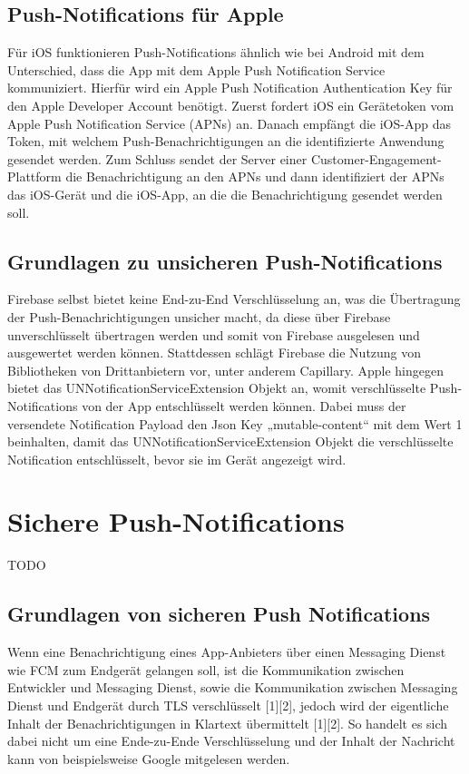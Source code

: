 \documentclass[sigconf]{acmart}
\begin{document}
\subsection{Push-Notifications für Apple}

Für iOS funktionieren Push-Notifications ähnlich wie bei Android 
mit dem Unterschied, dass die App mit dem Apple Push Notification 
Service kommuniziert. Hierfür wird ein Apple Push Notification 
Authentication Key für den Apple Developer Account benötigt. 
Zuerst fordert iOS ein Gerätetoken vom Apple Push Notification 
Service (APNs) an. Danach empfängt die iOS-App das Token, mit 
welchem Push-Benachrichtigungen an die identifizierte Anwendung 
gesendet werden. Zum Schluss sendet der Server einer 
Customer-Engagement-Plattform die Benachrichtigung an den APNs 
und dann identifiziert der APNs das iOS-Gerät und die iOS-App, 
an die die Benachrichtigung gesendet werden soll.

\subsection{Grundlagen zu unsicheren Push-Notifications}

Firebase selbst bietet keine End-zu-End Verschlüsselung an, was 
die Übertragung der Push-Benachrichtigungen unsicher macht, da 
diese über Firebase unverschlüsselt übertragen werden und somit 
von Firebase ausgelesen und ausgewertet werden können. Stattdessen 
schlägt Firebase die Nutzung von Bibliotheken von Drittanbietern vor, 
unter anderem Capillary.
Apple hingegen bietet das UNNotificationServiceExtension Objekt an, 
womit verschlüsselte Push-Notifications von der App entschlüsselt 
werden können. Dabei muss der versendete Notification Payload den 
Json Key „mutable-content“ mit dem Wert 1 beinhalten, damit das 
UNNotificationServiceExtension Objekt die verschlüsselte Notification 
entschlüsselt, bevor sie im Gerät angezeigt wird.

\section{Sichere Push-Notifications}

TODO

\subsection{Grundlagen von sicheren Push Notifications}

Wenn eine Benachrichtigung eines App-Anbieters über einen Messaging 
Dienst wie FCM zum Endgerät gelangen soll, ist die Kommunikation 
zwischen Entwickler und Messaging Dienst, sowie die Kommunikation 
zwischen Messaging Dienst und Endgerät durch TLS verschlüsselt [1][2], 
jedoch wird der eigentliche Inhalt der Benachrichtigungen in Klartext 
übermittelt [1][2]. So handelt es sich dabei nicht um eine 
Ende-zu-Ende Verschlüsselung und der Inhalt der Nachricht kann von 
beispielsweise Google mitgelesen werden.
\end{document}
